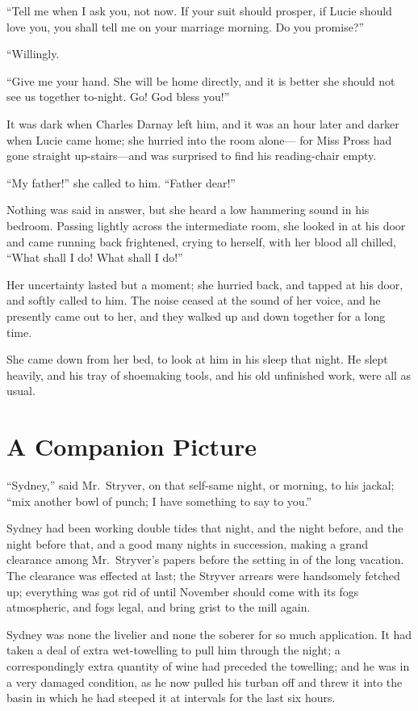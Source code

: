 ``Tell me when I ask you, not now.  If your suit should prosper, if
Lucie should love you, you shall tell me on your marriage morning.
Do you promise?''

``Willingly.

``Give me your hand.  She will be home directly, and it is better she
should not see us together to-night.  Go!  God bless you!''

It was dark when Charles Darnay left him, and it was an hour later
and darker when Lucie came home; she hurried into the room alone---%
for Miss Pross had gone straight up-stairs---and was surprised to find
his reading-chair empty.

``My father!'' she called to him.  ``Father dear!''

Nothing was said in answer, but she heard a low hammering sound in
his bedroom.  Passing lightly across the intermediate room, she
looked in at his door and came running back frightened, crying to
herself, with her blood all chilled, ``What shall I do!  What shall I do!''

Her uncertainty lasted but a moment; she hurried back, and tapped at
his door, and softly called to him.  The noise ceased at the sound of
her voice, and he presently came out to her, and they walked up and
down together for a long time.

She came down from her bed, to look at him in his sleep that night.
He slept heavily, and his tray of shoemaking tools, and his old
unfinished work, were all as usual.



\chapter{A Companion Picture}


``Sydney,'' said Mr.\ Stryver, on that self-same night, or morning, to his
jackal; ``mix another bowl of punch; I have something to say to you.''

Sydney had been working double tides that night, and the night before,
and the night before that, and a good many nights in succession, making
a grand clearance among Mr.\ Stryver's papers before the setting in of
the long vacation.  The clearance was effected at last; the Stryver
arrears were handsomely fetched up; everything was got rid of until
November should come with its fogs atmospheric, and fogs legal, and
bring grist to the mill again.

Sydney was none the livelier and none the soberer for so much application.
It had taken a deal of extra wet-towelling to pull him through the night;
a correspondingly extra quantity of wine had preceded the towelling;
and he was in a very damaged condition, as he now pulled his turban
off and threw it into the basin in which he had steeped it at intervals
for the last six hours.

